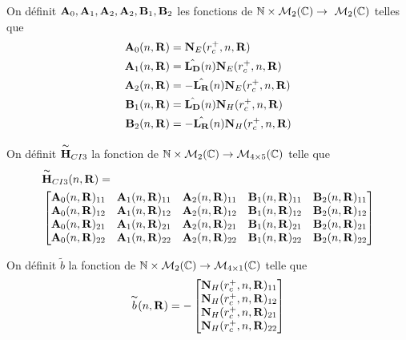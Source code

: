     \begin{defn}
      On définit \(\mathbf{A}_0,\mathbf{A}_1,\mathbf{A}_2,\mathbf{A}_2,\mathbf{B}_1,\mathbf{B}_2\) les fonctions de \(\mathbb N \times \mathcal{M}_2(\mathbb C) \rightarrow \ \mathcal{M}_2(\mathbb C)\) telles que        
      \begin{align*}
        \mathbf{A}_0(n,\mathbf{R}) &= \mathbf{N}_E(r_c^+,n,\mathbf{R})
        \\
        \mathbf{A}_1(n,\mathbf{R}) &= \hat{\mathbf{L_D}}(n)\mathbf{N}_E(r_c^+,n,\mathbf{R})
        \\
        \mathbf{A}_2(n,\mathbf{R}) &= -\hat{\mathbf{L_R}}(n)\mathbf{N}_E(r_c^+,n,\mathbf{R})
        \\
        \mathbf{B}_1(n,\mathbf{R}) &= \hat{\mathbf{L_D}}(n)\mathbf{N}_H(r_c^+,n,\mathbf{R})
        \\
        \mathbf{B}_2(n,\mathbf{R}) &= -\hat{\mathbf{L_R}}(n)\mathbf{N}_H(r_c^+,n,\mathbf{R})            
      \end{align*}

      On définit \(\overset{\thicksim}{\mathbf{H}}_{CI3}\) la fonction de \(\mathbb N \times \mathcal{M}_2(\mathbb C) \rightarrow \mathcal{M}_{4\times5}(\mathbb C)\) telle que
      \begin{align*}
        & \overset{\thicksim}{\mathbf{H}}_{CI3}(n,\mathbf{R}) =  \\ &
        \begin{bmatrix}
          \mathbf{A}_0(n,\mathbf{R})_{11} & \mathbf{A}_1(n,\mathbf{R})_{11} & \mathbf{A}_2(n,\mathbf{R})_{11} & \mathbf{B}_1(n,\mathbf{R})_{11} & \mathbf{B}_2(n,\mathbf{R})_{11}
          \\
          \mathbf{A}_0(n,\mathbf{R})_{12} & \mathbf{A}_1(n,\mathbf{R})_{12} & \mathbf{A}_2(n,\mathbf{R})_{12} & \mathbf{B}_1(n,\mathbf{R})_{12} & \mathbf{B}_2(n,\mathbf{R})_{12}
          \\
          \mathbf{A}_0(n,\mathbf{R})_{21} & \mathbf{A}_1(n,\mathbf{R})_{21} & \mathbf{A}_2(n,\mathbf{R})_{21} & \mathbf{B}_1(n,\mathbf{R})_{21} & \mathbf{B}_2(n,\mathbf{R})_{21}
          \\
          \mathbf{A}_0(n,\mathbf{R})_{22} & \mathbf{A}_1(n,\mathbf{R})_{22} & \mathbf{A}_2(n,\mathbf{R})_{22} & \mathbf{B}_1(n,\mathbf{R})_{22} & \mathbf{B}_2(n,\mathbf{R})_{22}
        \end{bmatrix}
      \end{align*}

      On définit \(\tilde{b}\) la fonction de \(\mathbb N \times \mathcal{M}_2(\mathbb C) \rightarrow \mathcal{M}_{4\times1}(\mathbb C)\) telle que
      \begin{equation*}
        \overset{\thicksim}{b}(n,\mathbf{R}) = -
        \begin{bmatrix}
          \mathbf{N}_H(r_c^+,n,\mathbf{R})_{11}
          \\
          \mathbf{N}_H(r_c^+,n,\mathbf{R})_{12}
          \\
          \mathbf{N}_H(r_c^+,n,\mathbf{R})_{21}
          \\
          \mathbf{N}_H(r_c^+,n,\mathbf{R})_{22}
        \end{bmatrix}
      \end{equation*}
    \end{defn}

